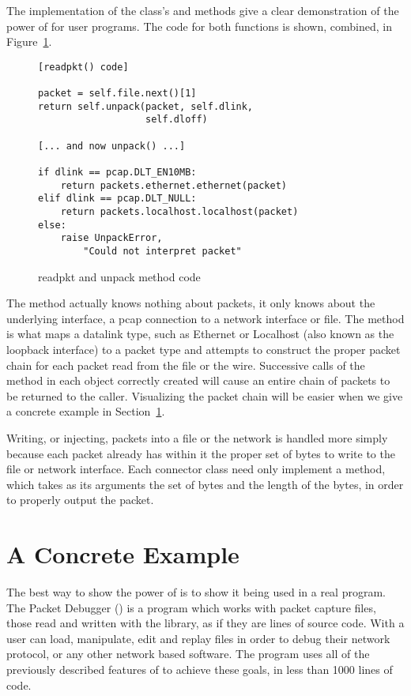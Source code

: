 \documentclass{sig-alternate-10pt}
\begin{document}
The implementation of the  class's
 and  methods give a clear
demonstration of the power of  for user programs.  The
code for both functions is shown, combined, in
Figure~\ref{fig:readpkt-and-unpack-code}.

\begin{figure}
  \centering
\begin{verbatim}
[readpkt() code]

packet = self.file.next()[1]
return self.unpack(packet, self.dlink, 
                   self.dloff)

[... and now unpack() ...]

if dlink == pcap.DLT_EN10MB:
    return packets.ethernet.ethernet(packet)
elif dlink == pcap.DLT_NULL:
    return packets.localhost.localhost(packet)
else:
    raise UnpackError, 
        "Could not interpret packet"
\end{verbatim}
  \caption{readpkt and unpack method code}
  \label{fig:readpkt-and-unpack-code}
\end{figure}

The  method actually knows nothing about packets, it
only knows about the underlying interface, a pcap connection to a
network interface or file.  The  method is what maps a
datalink type, such as Ethernet or Localhost (also known as the
loopback interface) to a packet type and attempts to construct the
proper packet chain for each packet read from the file or the wire.
Successive calls of the  method in each object correctly
created will cause an entire chain of packets to be returned to the
caller.  Visualizing the packet chain will be easier when we give a
concrete example in Section~\ref{sec:a-concrete-example}.

Writing, or injecting, packets into a file or the network is handled
more simply because each packet already has within it the proper set
of bytes to write to the file or network interface.  Each connector
class need only implement a  method, which takes as its
arguments the set of bytes and the length of the bytes, in order to
properly output the packet.

\section{A Concrete Example}
\label{sec:a-concrete-example}

The best way to show the power of  is to show it being
used in a real program.  The Packet Debugger () is a
program which works with packet capture files, those read and written
with the  library, as if they are lines of source code.
With  a user can load, manipulate, edit and replay
 files in order to debug their network protocol, or any
other network based software.  The  program uses all of
the previously described features of  to achieve these
goals, in less than 1000 lines of code.
\end{document}
